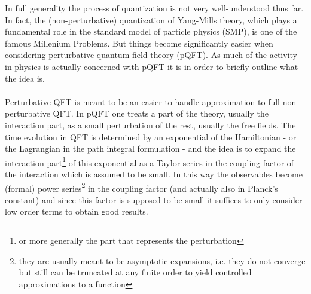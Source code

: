 In full generality the process of quantization is not very well-understood thus far. In fact, the (non-perturbative) quantization of Yang-Mills theory, which plays a fundamental role in the standard model of particle physics (SMP), is one of the famous {\glqq}Millenium Problems{\grqq}. But things become significantly easier when considering perturbative quantum field theory (pQFT). As much of the activity in physics is actually concerned with pQFT it is in order to briefly outline what the idea is.
\\\\
Perturbative QFT is meant to be an easier-to-handle approximation to full non-perturbative QFT. In pQFT one treats a part of the theory, usually the interaction part, as a small perturbation of the rest, usually the free fields. The time evolution in QFT is determined by an exponential of the Hamiltonian - or the Lagrangian in the path integral formulation - and the idea is to expand the interaction part\footnote{or more generally the part that represents the perturbation} of this exponential as a Taylor series in the coupling factor of the interaction which is assumed to be small. In this way the observables become (formal) power series\footnote{they are usually meant to be asymptotic expansions, i.e. they do not converge but still can be truncated at any finite order to yield controlled approximations to a function} in the coupling factor (and actually also in Planck's constant) and since this factor is supposed to be small it suffices to only consider low order terms to obtain good results.
\\
